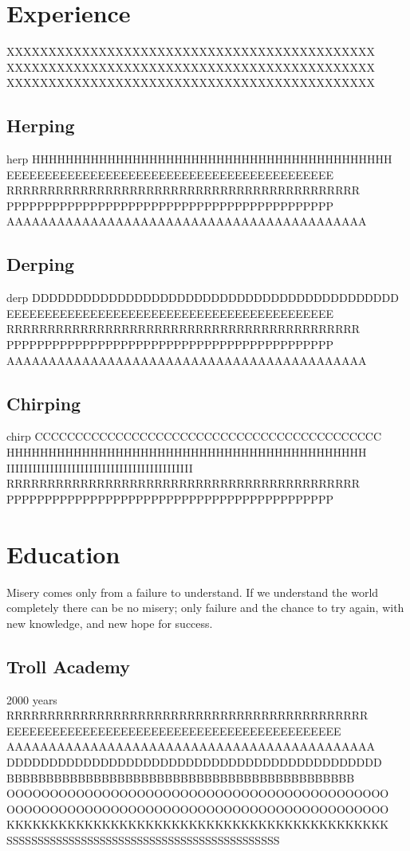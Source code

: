 \documentclass[letterpaper]{easyCV}
\begin{document}
\begin{main}
\section{Experience}
XXXXXXXXXXXXXXXXXXXXXXXXXXXXXXXXXXXXXXXXXXXX
XXXXXXXXXXXXXXXXXXXXXXXXXXXXXXXXXXXXXXXXXXXX
XXXXXXXXXXXXXXXXXXXXXXXXXXXXXXXXXXXXXXXXXXXX

\subsection{Herping}{herp}
HHHHHHHHHHHHHHHHHHHHHHHHHHHHHHHHHHHHHHHHHHH
EEEEEEEEEEEEEEEEEEEEEEEEEEEEEEEEEEEEEEEEEEE
RRRRRRRRRRRRRRRRRRRRRRRRRRRRRRRRRRRRRRRRRRR
PPPPPPPPPPPPPPPPPPPPPPPPPPPPPPPPPPPPPPPPPPP
AAAAAAAAAAAAAAAAAAAAAAAAAAAAAAAAAAAAAAAAAAA

\subsection{Derping}{derp}
DDDDDDDDDDDDDDDDDDDDDDDDDDDDDDDDDDDDDDDDDDD
EEEEEEEEEEEEEEEEEEEEEEEEEEEEEEEEEEEEEEEEEEE
RRRRRRRRRRRRRRRRRRRRRRRRRRRRRRRRRRRRRRRRRRR
PPPPPPPPPPPPPPPPPPPPPPPPPPPPPPPPPPPPPPPPPPP
AAAAAAAAAAAAAAAAAAAAAAAAAAAAAAAAAAAAAAAAAAA

\subsection{Chirping}{chirp}
CCCCCCCCCCCCCCCCCCCCCCCCCCCCCCCCCCCCCCCCCCC
HHHHHHHHHHHHHHHHHHHHHHHHHHHHHHHHHHHHHHHHHHH
IIIIIIIIIIIIIIIIIIIIIIIIIIIIIIIIIIIIIIIIIII
RRRRRRRRRRRRRRRRRRRRRRRRRRRRRRRRRRRRRRRRRRR
PPPPPPPPPPPPPPPPPPPPPPPPPPPPPPPPPPPPPPPPPPP

\section{Education}
Misery comes only from a failure to understand.  If we understand the world completely there can be no misery; only failure and the chance to try again, with new knowledge, and new hope for success.

\subsection{Troll Academy}{2000 years}
RRRRRRRRRRRRRRRRRRRRRRRRRRRRRRRRRRRRRRRRRRRR
EEEEEEEEEEEEEEEEEEEEEEEEEEEEEEEEEEEEEEEEEEEE
AAAAAAAAAAAAAAAAAAAAAAAAAAAAAAAAAAAAAAAAAAAA
DDDDDDDDDDDDDDDDDDDDDDDDDDDDDDDDDDDDDDDDDDDD
\break
BBBBBBBBBBBBBBBBBBBBBBBBBBBBBBBBBBBBBBBBBBBB
OOOOOOOOOOOOOOOOOOOOOOOOOOOOOOOOOOOOOOOOOOOO
OOOOOOOOOOOOOOOOOOOOOOOOOOOOOOOOOOOOOOOOOOOO
KKKKKKKKKKKKKKKKKKKKKKKKKKKKKKKKKKKKKKKKKKKK
SSSSSSSSSSSSSSSSSSSSSSSSSSSSSSSSSSSSSSSSSSSS

\end{main}
\end{document}
